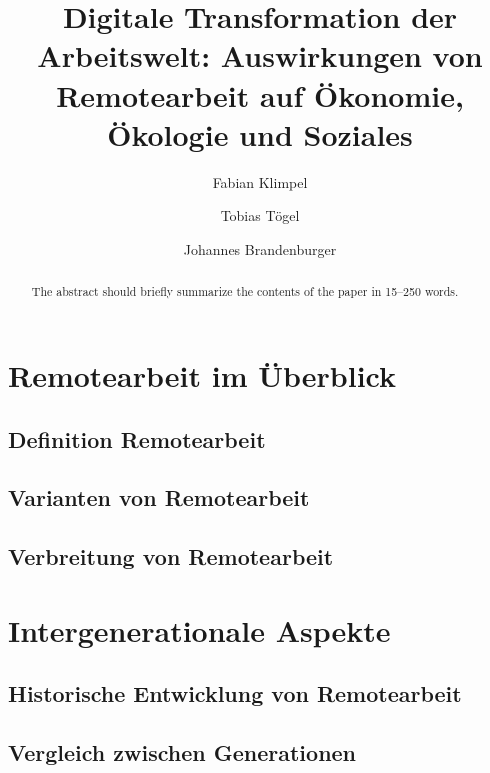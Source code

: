 \documentclass[runningheads]{llncs}
\begin{document}
\title{Digitale Transformation der Arbeitswelt: Auswirkungen von Remotearbeit auf Ökonomie, Ökologie und Soziales}


\author{Fabian Klimpel\orcidID{} \and
Tobias Tögel\orcidID{} \and
Johannes Brandenburger\orcidID{}}
%

%
\maketitle              %
%
\begin{abstract}
The abstract should briefly summarize the contents of the paper in
15--250 words.

\end{abstract}


\newpage
\section{Remotearbeit im Überblick}

\subsection{Definition Remotearbeit}

\subsection{Varianten von Remotearbeit}

\subsection{Verbreitung von Remotearbeit}

\newpage
\section{Intergenerationale Aspekte}

\subsection{Historische Entwicklung von Remotearbeit}

\subsection{Vergleich zwischen Generationen}
\end{document}
